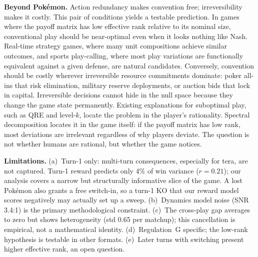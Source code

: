 \documentclass{article}
\begin{document}
\textbf{Beyond Pok\'emon.} Action redundancy makes convention free; irreversibility makes it costly. This pair of conditions yields a testable prediction. In games where the payoff matrix has low effective rank relative to its nominal size, conventional play should be near-optimal even when it looks nothing like Nash. Real-time strategy games, where many unit compositions achieve similar outcomes, and sports play-calling, where most play variations are functionally equivalent against a given defense, are natural candidates. Conversely, convention should be costly wherever irreversible resource commitments dominate: poker all-ins that risk elimination, military reserve deployments, or auction bids that lock in capital. Irreversible decisions cannot hide in the null space because they change the game state permanently. Existing explanations for suboptimal play, such as QRE and level-$k$, locate the problem in the player's rationality. Spectral decomposition locates it in the game itself: if the payoff matrix has low rank, most deviations are irrelevant regardless of why players deviate. The question is not whether humans are rational, but whether the game notices.

\textbf{Limitations.} (a)~Turn-1 only: multi-turn consequences, especially for tera, are not captured. Turn-1 reward predicts only 4\% of win variance ($r = 0.21$); our analysis covers a narrow but structurally informative slice of the game. A lost Pok\'emon also grants a free switch-in, so a turn-1 KO that our reward model scores negatively may actually set up a sweep. (b)~Dynamics model noise (SNR 3.4:1) is the primary methodological constraint. (c)~The cross-play gap averages to zero but shows heterogeneity (std 0.65 per matchup); this cancellation is empirical, not a mathematical identity. (d)~Regulation~G specific; the low-rank hypothesis is testable in other formats. (e)~Later turns with switching present higher effective rank, an open question.



\end{document}
